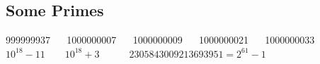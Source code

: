 \subsection{Some Primes}

999999937 $\quad$ 1000000007 $\quad$ 1000000009 $\quad$ 1000000021 $\quad$ 1000000033
$10^{18} - 11 \quad\quad 10^{18} + 3 \quad\quad\quad 2305843009213693951 = 2^{61} - 1$

